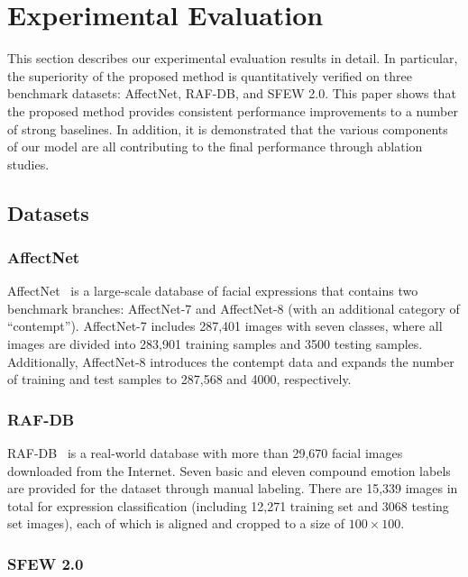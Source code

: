 \documentclass{article}
\begin{document}
\section{Experimental Evaluation}
\label{sec:exp}

{This section describes} our experimental evaluation results in detail. {In particular, the superiority of the proposed method is quantitatively verified} on three benchmark datasets: AffectNet, RAF-DB, and SFEW 2.0. This paper shows that the proposed method provides consistent performance improvements to a number of strong baselines. In addition, {it is demonstrated} that the various components of our model are all contributing to the final performance through ablation studies.

\subsection{Datasets}

\subsubsection{AffectNet} 
AffectNet~\cite{dhall2012collecting} is a large-scale database of facial expressions that contains two benchmark branches: AffectNet-7 and AffectNet-8 (with an additional category of ``contempt''). AffectNet-7 includes 287,401 images with seven classes, where all images are divided into 283,901 training samples and 3500 testing samples. Additionally, AffectNet-8 introduces the contempt data and expands the number of training and test samples to 287,568 and 4000, respectively.

\subsubsection{RAF-DB} 
RAF-DB~\cite{li2018reliable} is a real-world database with more than 29,670 facial images downloaded from the Internet. Seven basic and eleven compound emotion labels are provided for the dataset through manual labeling. There are 15,339  images in total for expression classification (including 12,271 training set and 3068 testing set images), each of which is aligned and cropped to a size of $100 \times 100$. 

\subsubsection{SFEW 2.0} 
\end{document}
